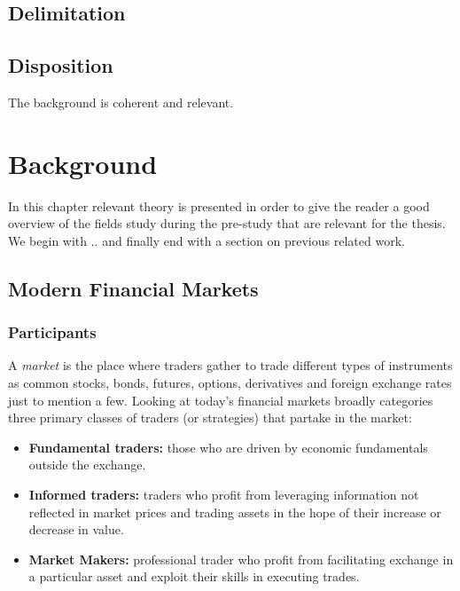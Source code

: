 \documentclass{kththesis}
\theoremstyle{definition}
\begin{document}
\section{Delimitation}

\section{Disposition}


The background is coherent and relevant.
\chapter{Background}
In this chapter relevant theory is presented in order to give the reader a good overview of the fields study during the pre-study that are relevant for the thesis. We begin with .. and finally end with a section on previous related work.

\section{Modern Financial Markets}

\subsection{Participants}
A \textit{market} is the place where traders gather to trade \parencite{harris2003trading} different types of instruments as common stocks, bonds, futures, options, derivatives and foreign exchange rates just to mention a few.
Looking at today's financial markets
\textcite{cartea2015algorithmic} broadly categories three primary classes of traders (or strategies) that partake in the market:
\begin{itemize}
    \item \textbf{Fundamental traders:} those who are driven by economic fundamentals outside the exchange.
    \item \textbf{Informed traders:} traders who profit from leveraging information not reflected in market prices and trading assets in the hope of their increase or decrease in value.
    \item \textbf{Market Makers:} professional trader who profit from facilitating exchange in a particular asset and exploit their skills in executing trades.
\end{itemize}
\end{document}

